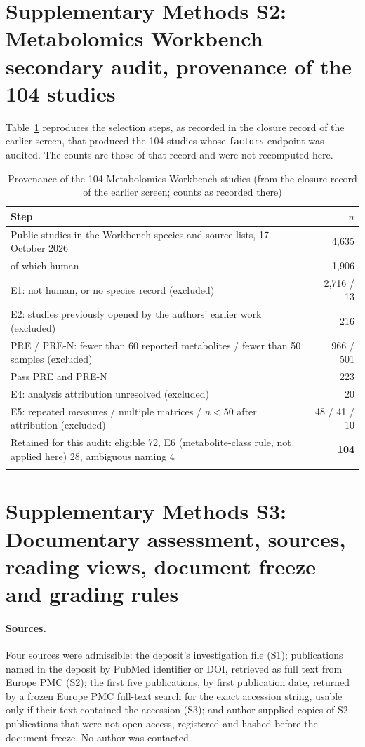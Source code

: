 \documentclass[sn-basic]{sn-jnl}
\begin{document}
\section*{Supplementary Methods S2: Metabolomics Workbench secondary audit, provenance of the 104 studies}
Table~\ref{tab:S1} reproduces the selection steps, as recorded in the closure record of the earlier screen, that produced the 104 studies whose \texttt{factors} endpoint was audited. The counts are those of that record and were not recomputed here.
\begin{table}[!ht]
\caption{Provenance of the 104 Metabolomics Workbench studies (from the closure record of the earlier screen; counts as recorded there)}\label{tab:S1}
\begin{tabular*}{\textwidth}{@{\extracolsep\fill}p{}r}
\toprule
Step & $n$ \\
\midrule
Public studies in the Workbench species and source lists, 17 October 2026 & 4,635 \\
\quad of which human & 1,906 \\
E1: not human, or no species record (excluded) & 2,716 / 13 \\
E2: studies previously opened by the authors' earlier work (excluded) & 216 \\
PRE / PRE-N: fewer than 60 reported metabolites / fewer than 50 samples (excluded) & 966 / 501 \\
Pass PRE and PRE-N & 223 \\
E4: analysis attribution unresolved (excluded) & 20 \\
E5: repeated measures / multiple matrices / $n<50$ after attribution (excluded) & 48 / 41 / 10 \\
Retained for this audit: eligible 72, E6 (metabolite-class rule, not applied here) 28, ambiguous naming 4 & \textbf{104} \\
\botrule
\end{tabular*}
\end{table}

\section*{Supplementary Methods S3: Documentary assessment, sources, reading views, document freeze and grading rules}
\paragraph{Sources.} Four sources were admissible: the deposit's investigation file (S1); publications named in the
deposit by PubMed identifier or DOI, retrieved as full text from Europe PMC (S2); the first five publications, by
first publication date, returned by a frozen Europe PMC full-text search for the exact accession string, usable only
if their text contained the accession (S3); and author-supplied copies of S2 publications that were not open access,
registered and hashed before the document freeze. No author was contacted.
\end{document}
